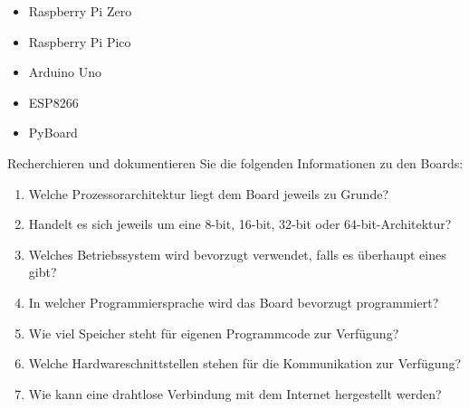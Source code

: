 \begin{itemize}
    \item Raspberry Pi Zero
    \item Raspberry Pi Pico
    \item Arduino Uno
    \item ESP8266
    \item PyBoard
\end{itemize}

Recherchieren und dokumentieren Sie die folgenden Informationen zu den Boards:

\begin{enumerate}
    \item Welche Prozessorarchitektur liegt dem Board jeweils zu Grunde?
    \item Handelt es sich jeweils um eine 8-bit, 16-bit, 32-bit oder 64-bit-Architektur?
    \item Welches Betriebssystem wird bevorzugt verwendet, falls es überhaupt eines gibt?
    \item In welcher Programmiersprache wird das Board bevorzugt programmiert?
    \item Wie viel Speicher steht für eigenen Programmcode zur Verfügung?
    \item Welche Hardwareschnittstellen stehen für die Kommunikation zur Verfügung?
    \item Wie kann eine drahtlose Verbindung mit dem Internet hergestellt werden?
\end{enumerate}






